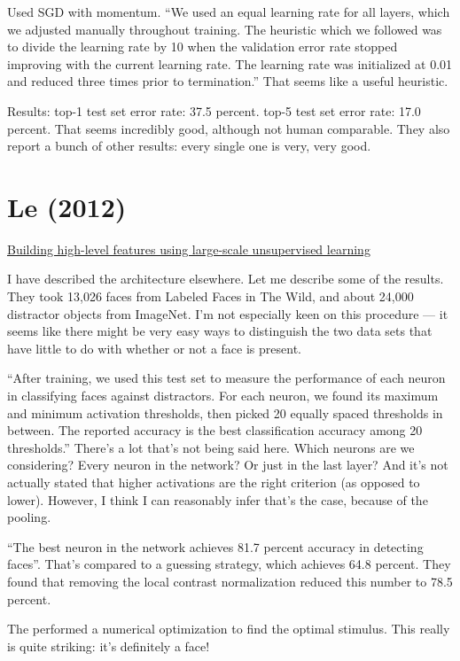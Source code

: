 \documentclass[12pt]{report}
\newcommand{\link}[2]{\href{#1}{#2}}
\begin{document}
Used SGD with momentum.  ``We used an equal learning rate for all
layers, which we adjusted manually throughout training.  The heuristic
which we followed was to divide the learning rate by 10 when the
validation error rate stopped improving with the current learning
rate.  The learning rate was initialized at 0.01 and reduced three
times prior to termination.''   That seems like a useful heuristic.

Results: top-1 test set error rate: 37.5 percent.  top-5 test set
error rate: 17.0 percent.  That seems incredibly good, although not
human comparable.  They also report a bunch of other results: every
single one is very, very good.

\section{Le (2012)}

\link{http://ai.stanford.edu/\~ang/papers/icml12-HighLevelFeaturesUsingUnsupervisedLearning.pdf}{Building
  high-level features using large-scale unsupervised learning}

I have described the architecture elsewhere.  Let me describe some of
the results.  They took 13,026 faces from Labeled Faces in The Wild,
and about 24,000 distractor objects from ImageNet.  I'm not especially
keen on this procedure --- it seems like there might be very easy ways
to distinguish the two data sets that have little to do with whether
or not a face is present.

``After training, we used this test set to measure the performance of
each neuron in classifying faces against distractors.  For each
neuron, we found its maximum and minimum activation thresholds, then
picked 20 equally spaced thresholds in between.  The reported accuracy
is the best classification accuracy among 20 thresholds.''  There's a
lot that's not being said here.  Which neurons are we considering?
Every neuron in the network?  Or just in the last layer?  And it's not
actually stated that higher activations are the right criterion (as
opposed to lower).  However, I think I can reasonably infer that's the
case, because of the pooling.

``The best neuron in the network achieves 81.7 percent accuracy in
detecting faces''.  That's compared to a guessing strategy, which
achieves 64.8 percent.  They found that removing the local contrast
normalization reduced this number to 78.5 percent.

The performed a numerical optimization to find the optimal stimulus.
This really is quite striking: it's definitely a face!
\end{document}
